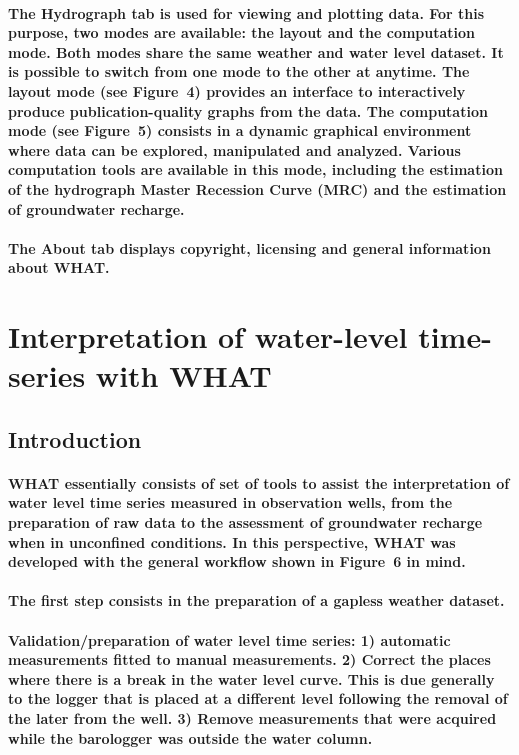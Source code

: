 \documentclass[10pt, letterpaper, fleqn]{report}
\begin{document}
\paragraph{The Hydrograph tab is used for viewing and plotting data. For this purpose, two modes are available: the layout and the computation mode. Both modes share the same weather and water level dataset. It is possible to switch from one mode to the other at anytime. The layout mode (see Figure 4) provides an interface to interactively produce publication-quality graphs from the data. The computation mode (see Figure 5) consists in a dynamic graphical environment where data can be explored, manipulated and analyzed. Various computation tools are available in this mode, including the estimation of the hydrograph Master Recession Curve (MRC) and the estimation of groundwater recharge.}
\paragraph{The About tab displays copyright, licensing and general information about WHAT.}

\section{Interpretation of water-level time-series with WHAT}

\subsection{Introduction}

\paragraph{WHAT essentially consists of set of tools to assist the interpretation of water level time series measured in observation wells, from the preparation of raw data to the assessment of groundwater recharge when in unconfined conditions. In this perspective, WHAT was developed with the general workflow shown in Figure 6  in mind.}
\paragraph{The first step consists in the preparation of a gapless weather dataset.}
\paragraph{Validation/preparation of water level time series: 1) automatic measurements fitted to manual measurements. 2) Correct the places where there is a break in the water level curve. This is due generally to the logger that is placed at a different level following the removal of the later from the well. 3) Remove measurements that were acquired while the barologger was outside the water column.}
\end{document}
